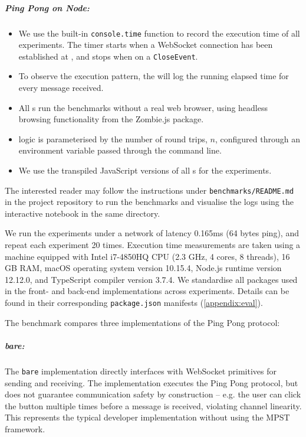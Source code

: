 \subparagraph{Ping Pong  on Node:}
\begin{itemize}

\item We use the built-in \texttt{console.time} function to record
the execution time of all experiments. 
The timer starts when a WebSocket connection has been established at
, and stops when on a \texttt{CloseEvent}.

\item To observe the execution pattern, the  will log the running 
elapsed time for every  message received.

\item All s run the benchmarks without a real web browser,
using headless browsing functionality from 
the Zombie.js \cite{zombie} package.

\item {} logic is parameterised by the number of round trips,
$n$, configured through an environment variable passed through 
the command line.

\item We use the transpiled JavaScript versions of all s
for the experiments.

\end{itemize}

The interested reader may follow the instructions under
\texttt{benchmarks/README.md} in the project repository \cite{repo}
to run the benchmarks and visualise the logs using the interactive
notebook in the same directory.

We run the experiments under a network of latency 0.165ms
(64 bytes ping), and repeat each experiment 20 times.
Execution time measurements  are taken using a machine 
equipped with Intel i7-4850HQ CPU (2.3 GHz, 4 cores, 8 threads), 
16 GB RAM, macOS operating system version 10.15.4, 
Node.js runtime version 12.12.0, and
TypeScript compiler version 3.7.4.
We standardise all packages used in the front- and back-end
implementations across experiments. Details can be found in their
corresponding \texttt{package.json} manifests (\cref{appendix:eval}).

The benchmark compares three implementations of the Ping Pong protocol:

\subparagraph{bare:}
The \texttt{bare} implementation directly interfaces with 
WebSocket primitives for sending and receiving. 
The implementation executes the Ping Pong protocol, but does not 
guarantee communication safety by construction -- e.g. the user can click
the  button multiple times before a  message 
is received, violating channel linearity. 
This represents the typical developer implementation without using the
MPST framework.

